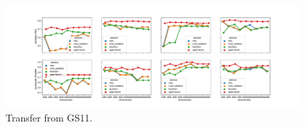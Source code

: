 \begin{figure}[b]
  \centering
    \includegraphics[width=\textwidth]{supplement/figures/GS11-transfer}
    \caption{Transfer from GS11.}
    \label{fig:gs11-transfer}
\end{figure}

